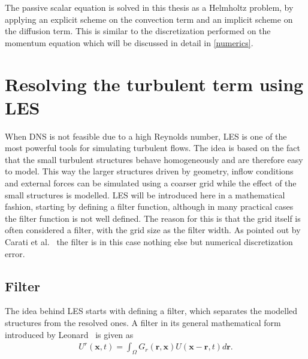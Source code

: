 The passive scalar equation is solved in this thesis as a Helmholtz problem, by applying an explicit scheme on the convection term and an implicit 
scheme on the diffusion term. This is similar to the discretization performed on the momentum equation which will be discussed in 
detail in \cref{numerics}. 

\section{Resolving the turbulent term using LES} \label{LES}
When DNS is not feasible due to a high Reynolds number, LES is one of the most powerful tools for simulating turbulent flows.
The idea is based on the fact that the small turbulent structures behave homogeneously and are therefore easy to model.
This way the larger structures driven by geometry, inflow conditions and external forces can be simulated using a coarser 
grid while the effect of the small structures is modelled. 
LES will be introduced here in a mathematical fashion, starting by defining a filter function,
although in many practical cases the filter function is not well defined.
The reason for this is that the grid itself is often considered a filter, with the 
grid size as the filter width. As pointed out by Carati et al.~\cite{Carati} the filter is in this case nothing else but 
numerical discretization error. 

\subsection{Filter}
The idea behind LES starts with defining a filter, which separates the modelled structures from the resolved ones. 
A filter in its general mathematical form introduced by Leonard~\cite{Leonard} is given as 
\begin{align}
    U^r(\mathbf{x},t) = \int_{\Omega} G_r(\mathbf{r},\mathbf{x})U(\mathbf{x}-\mathbf{r},t)d\mathbf{r}.
    \label{eq:filter}
\end{align}


 

